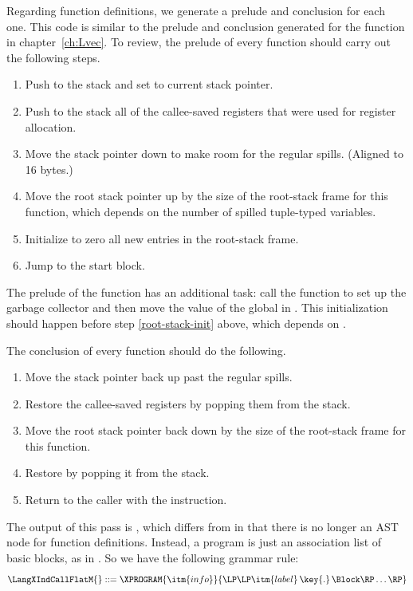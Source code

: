 \documentclass[7x10]{TimesAPriori_MIT}%
\numberwithin{theorem}{chapter}
\numberwithin{definition}{chapter}
\numberwithin{equation}{chapter}
\begin{document}
Regarding function definitions, we generate a prelude and conclusion
for each one. This code is similar to the prelude and conclusion
generated for the  function in chapter~\ref{ch:Lvec}. To
review, the prelude of every function should carry out the following
steps.
\begin{enumerate}
\item Push  to the stack and set  to current stack
  pointer.
\item Push to the stack all of the callee-saved registers that were
  used for register allocation.
\item Move the stack pointer  down to make room for the
  regular spills. (Aligned to 16 bytes.)
\item Move the root stack pointer  up by the size of the
  root-stack frame for this function, which depends on the number of
  spilled tuple-typed variables. \label{root-stack-init}
\item Initialize to zero all new entries in the root-stack frame.
\item Jump to the start block.
\end{enumerate}
The prelude of the  function has an additional task: call
the  function to set up the garbage collector and
then move the value of the global  in
. This initialization should happen before step \ref{root-stack-init}
above, which depends on .

The conclusion of every function should do the following.
\begin{enumerate}
\item Move the stack pointer back up past the regular spills.
\item Restore the callee-saved registers by popping them from the
  stack.
\item Move the root stack pointer back down by the size of the
  root-stack frame for this function.
\item Restore  by popping it from the stack.
\item Return to the caller with the  instruction.
\end{enumerate}

The output of this pass is \LangXIndCallFlat{}, which differs from
\LangXIndCall{} in that there is no longer an AST node for function
definitions. Instead, a program is just an association list of basic
blocks, as in \LangXGlobal{}. So we have the following grammar rule:
\[
\LangXIndCallFlatM{} ::= \XPROGRAM{\itm{info}}{\LP\LP\itm{label} \,\key{.}\, \Block \RP\ldots\RP}
\]
\end{document}
